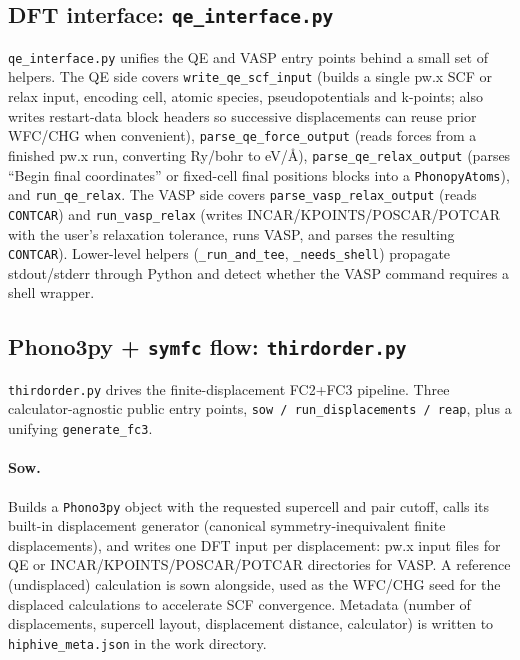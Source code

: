 \subsection{DFT interface: \texttt{qe\_interface.py}}
\label{sec:dft_interface}

\texttt{qe\_interface.py} unifies the QE and VASP entry points
behind a small set of helpers.  The QE side covers
\texttt{write\_qe\_scf\_input} (builds a single pw.x SCF or relax
input, encoding cell, atomic species, pseudopotentials and k-points;
also writes restart-data block headers so successive displacements can
reuse prior WFC/CHG when convenient),
\texttt{parse\_qe\_force\_output} (reads forces from a finished pw.x
run, converting Ry/bohr to eV/\AA),
\texttt{parse\_qe\_relax\_output} (parses ``Begin final coordinates''
or fixed-cell final positions blocks into a \texttt{PhonopyAtoms}),
and \texttt{run\_qe\_relax}.  The VASP side covers
\texttt{parse\_vasp\_relax\_output} (reads \texttt{CONTCAR}) and
\texttt{run\_vasp\_relax} (writes INCAR/KPOINTS/POSCAR/POTCAR with
the user's relaxation tolerance, runs VASP, and parses the resulting
\texttt{CONTCAR}).  Lower-level helpers (\texttt{\_run\_and\_tee},
\texttt{\_needs\_shell}) propagate stdout/stderr through Python and
detect whether the VASP command requires a shell wrapper.

\subsection{Phono3py + \texttt{symfc} flow: \texttt{thirdorder.py}}
\label{sec:thirdorder}

\texttt{thirdorder.py} drives the finite-displacement FC2+FC3
pipeline.  Three calculator-agnostic public entry points,
\texttt{sow / run\_displacements / reap}, plus a unifying
\texttt{generate\_fc3}.

\paragraph{Sow.}  Builds a \texttt{Phono3py} object with the requested
supercell and pair cutoff, calls its built-in displacement generator
(canonical symmetry-inequivalent finite displacements), and writes one
DFT input per displacement: pw.x input files for QE or
INCAR/KPOINTS/POSCAR/POTCAR directories for VASP.  A reference
(undisplaced) calculation is sown alongside, used as the WFC/CHG
seed for the displaced calculations to accelerate SCF convergence.
Metadata (number of displacements, supercell layout, displacement
distance, calculator) is written to \texttt{hiphive\_meta.json} in
the work directory.

